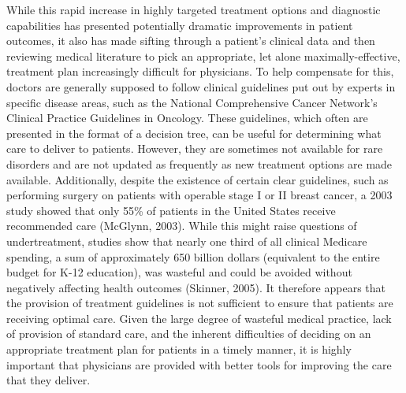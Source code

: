 \documentclass[]{spie}  %
\begin{document}
While this rapid increase in highly targeted treatment options and diagnostic capabilities has presented potentially dramatic improvements in patient outcomes, it also has made sifting through a patient’s clinical data and then reviewing medical literature to pick an appropriate, let alone maximally-effective, treatment plan increasingly difficult for physicians. To help compensate for this, doctors are generally supposed to follow clinical guidelines put out by experts in specific disease areas, such as the National Comprehensive Cancer Network’s Clinical Practice Guidelines in Oncology. These guidelines, which often are presented in the format of a decision tree, can be useful for determining what care to deliver to patients. However, they are sometimes not available for rare disorders and are not updated as frequently as new treatment options are made available. Additionally, despite the existence of certain clear guidelines, such as performing surgery on patients with operable stage I or II breast cancer, a 2003 study showed that only 55\% of patients in the United States receive recommended care (McGlynn, 2003). While this might raise questions of undertreatment, studies show that nearly one third of all clinical Medicare spending, a sum of approximately 650 billion dollars (equivalent to the entire budget for K-12 education), was wasteful and could be avoided without negatively affecting health outcomes (Skinner, 2005). It therefore appears that the provision of treatment guidelines is not sufficient to ensure that patients are receiving optimal care. Given the large degree of wasteful medical practice, lack of provision of standard care, and the inherent difficulties of deciding on an appropriate treatment plan for patients in a timely manner, it is highly important that physicians are provided with better tools for improving the care that they deliver.
\end{document}
